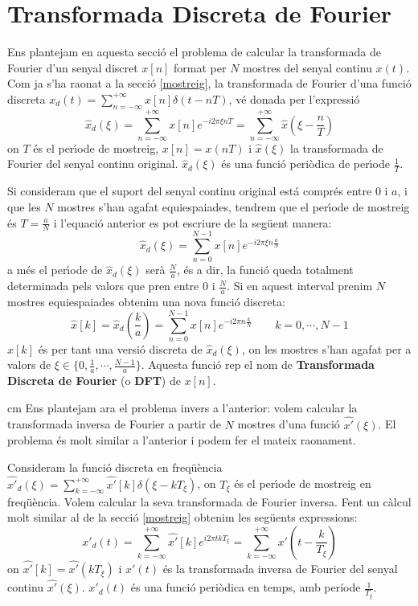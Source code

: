 \documentclass{article}
\begin{document}
\newpage
\section{Transformada Discreta de Fourier}
Ens plantejam en aquesta secci\'o el problema de calcular la transformada de
Fourier d'un senyal discret $x[n]$ format per $N$ mostres del senyal continu
$x(t)$.
Com ja s'ha raonat a la secci\'o \ref{mostreig}, la transformada de Fourier
d'una funci\'o discreta $x_d(t)=\sum_{n=-\infty}^{+\infty} x[n] \delta(t-nT)$,
v\'e donada per l'expressi\'o
\[
\hat{x}_d(\xi)=\sum_{n=-\infty}^{+\infty} x[n] e^{-i 2 \pi \xi n T}=
\sum_{n=-\infty}^{+\infty} \hat{x}(\xi-\frac{n}{T})
\]
\noindent
on $T$ \'es el per\'\i ode de mostreig, $x[n]=x(nT)$ i $\hat{x}(\xi)$ 
la transformada de 
Fourier del senyal continu original. 
$\hat{x}_d(\xi)$ \'es una funci\'o peri\`odica de per\'\i ode 
$\frac{1}{T}$.

Si consideram que el suport del senyal continu original est\'a compr\'es 
entre $0$ i $a$, i que les $N$ mostres s'han agafat equiespaiades, tendrem
que el per\'\i ode de mostreig \'es $T=\frac{a}{N}$ i l'equaci\'o anterior
es pot escriure de la seg\"uent manera:
\[
\hat{x}_d(\xi)=\sum_{n=0}^{N-1} x[n] e^{-i 2 \pi \xi n \frac{a}{N}}
\]
\noindent
a m\'es el per\'\i ode de $\hat{x}_d(\xi)$ ser\`a $\frac{N}{a}$, \'es a dir,
la funci\'o queda totalment determinada pels valors que pren entre $0$ i 
$\frac{N}{a}$. Si en aquest interval prenim $N$ mostres equiespaiades
obtenim una nova funci\'o discreta:
\begin{equation}
\label{DFT}
\hat{x}[k]=\hat{x}_d(\frac{k}{a})=\sum_{n=0}^{N-1} x[n] e^{-i 2 \pi n \frac{k}{N}}
\qquad k=0,\cdots, N-1 
\end{equation}
\noindent
$\hat{x}[k]$ \'es per tant una versi\'o discreta de $\hat{x}_d(\xi)$, on les mostres
s'han agafat per a valors de $\xi\in\{0, \frac{1}{a}, \cdots, \frac{N-1}{a}\}$.
Aquesta funci\'o rep el nom de {\bf Transformada Discreta de Fourier}  
(o {\bf DFT}) de $x[n]$.

 cm
Ens plantejam ara el problema invers a l'anterior: volem calcular la transformada
inversa de Fourier a partir de $N$ mostres d'una funci\'o $\widehat{x'}(\xi)$.
El problema \'es molt similar a l'anterior i podem fer el mateix raonament.

Consideram la funci\'o discreta en freq\"u\`encia 
$\widehat{x'}_d(\xi)=\sum_{k=-\infty}^{+\infty} \widehat{x'}[k] \delta(\xi-k T_\xi)$,
on $T_{\xi}$ \'es el per\'\i ode de mostreig en freq\"u\`encia.
Volem calcular la seva transformada de Fourier inversa. Fent un c\`alcul
molt similar al de la secci\'o \ref{mostreig} obtenim les seg\"uents expressions:
\[
x'_d(t)=\sum_{k=-\infty}^{+\infty} \widehat{x'}[k] e^{i 2 \pi t k T_\xi}=
\sum_{k=-\infty}^{+\infty} x'(t-\frac{k}{T_\xi})
\]
\noindent
on $\widehat{x'}[k]=\widehat{x'}(k T_\xi)$ i $x'(t)$ \'es la transformada inversa de 
Fourier del senyal continu $\hat{x'}(\xi)$.
$x'_d(t)$ \'es una funci\'o peri\`odica en temps, amb per\'iode $\frac{1}{T_\xi}$.
\end{document}
